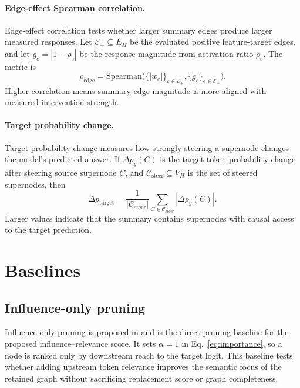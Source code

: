 \documentclass[../main.tex]{subfiles}
\begin{document}
\paragraph{Edge-effect Spearman correlation.}
Edge-effect correlation tests whether larger summary edges produce larger
measured responses. Let $\mathcal{E}_{+}\subseteq E_H$ be the evaluated positive
feature-target edges, and let $g_e = |1-\rho_e|$ be the response magnitude from
activation ratio $\rho_e$. The metric is
\begin{equation}
\rho_{\text{edge}}
=
\mathrm{Spearman}\bigl(\{|w_e|\}_{e\in\mathcal{E}_{+}},
                        \{g_e\}_{e\in\mathcal{E}_{+}}\bigr).
\label{eq:metric-spearman}
\end{equation}
Higher correlation means summary edge magnitude is more aligned with measured
intervention strength.

\paragraph{Target probability change.}
Target probability change measures how strongly steering a supernode changes the
model's predicted answer. If $\Delta p_y(C)$ is the target-token probability
change after steering source supernode $C$, and
$\mathcal{C}_{\text{steer}}\subseteq V_H$ is the set of steered supernodes, then
\begin{equation}
\Delta p_{\text{target}}
=
\frac{1}{|\mathcal{C}_{\text{steer}}|}
\sum_{C\in\mathcal{C}_{\text{steer}}} |\Delta p_y(C)|.
\label{eq:metric-target-delta}
\end{equation}
Larger values indicate that the summary contains supernodes with causal access to
the target prediction.

\section{Baselines}
\label{sec:baselines}

\subsection{Influence-only pruning}
Influence-only pruning is proposed in \cite{ameisen2025circuit} and is the direct pruning baseline for the proposed
influence--relevance score. It sets $\alpha=1$ in Eq.~\eqref{eq:importance}, so a
node is ranked only by downstream reach to the target logit. This baseline tests
whether adding upstream token relevance improves the semantic focus of the
retained graph without sacrificing replacement score or graph completeness.
\end{document}
